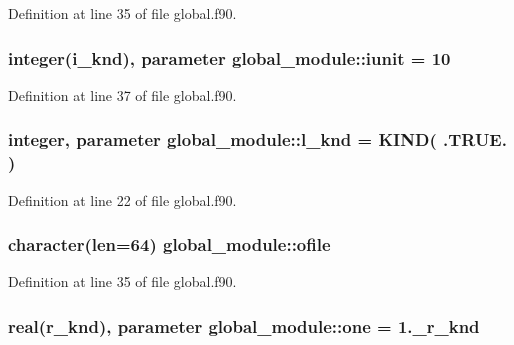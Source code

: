 Definition at line 35 of file global.\-f90.

\hypertarget{classglobal__module_a734e710669b353233ba6b431d2b10a60}{
\subsubsection[{iunit}]{\setlength{\rightskip}{0pt plus 5cm}integer({\bf i\-\_\-knd}), parameter global\-\_\-module\-::iunit = 10}}\label{classglobal__module_a734e710669b353233ba6b431d2b10a60}


Definition at line 37 of file global.\-f90.

\hypertarget{classglobal__module_a968ba1aa6e3f1767b59bfb8bd310405e}{
\subsubsection[{l\-\_\-knd}]{\setlength{\rightskip}{0pt plus 5cm}integer, parameter global\-\_\-module\-::l\-\_\-knd = K\-I\-N\-D( .T\-R\-U\-E. )}}\label{classglobal__module_a968ba1aa6e3f1767b59bfb8bd310405e}


Definition at line 22 of file global.\-f90.

\hypertarget{classglobal__module_af73eb645949440d8b32d555f3693d9bf}{
\subsubsection[{ofile}]{\setlength{\rightskip}{0pt plus 5cm}character(len=64) global\-\_\-module\-::ofile}}\label{classglobal__module_af73eb645949440d8b32d555f3693d9bf}


Definition at line 35 of file global.\-f90.

\hypertarget{classglobal__module_ad2273c99f1e5fd95558f9217ed48f65f}{
\subsubsection[{one}]{\setlength{\rightskip}{0pt plus 5cm}real({\bf r\-\_\-knd}), parameter global\-\_\-module\-::one = 1.\-\_\-r\-\_\-knd}}\label{classglobal__module_ad2273c99f1e5fd95558f9217ed48f65f}


